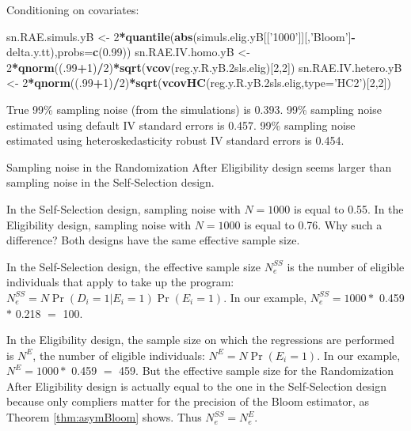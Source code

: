 \documentclass[]{book}
\newenvironment{Shaded}{\begin{snugshade}}{\end{snugshade}}
\newcommand{\KeywordTok}[1]{\textcolor[rgb]{0.13,0.29,0.53}{\textbf{#1}}}
\newcommand{\DataTypeTok}[1]{\textcolor[rgb]{0.13,0.29,0.53}{#1}}
\newcommand{\DecValTok}[1]{\textcolor[rgb]{0.00,0.00,0.81}{#1}}
\newcommand{\FloatTok}[1]{\textcolor[rgb]{0.00,0.00,0.81}{#1}}
\newcommand{\StringTok}[1]{\textcolor[rgb]{0.31,0.60,0.02}{#1}}
\newcommand{\OperatorTok}[1]{\textcolor[rgb]{0.81,0.36,0.00}{\textbf{#1}}}
\newcommand{\NormalTok}[1]{#1}
\theoremstyle{definition}
\theoremstyle{definition}
\theoremstyle{definition}
\theoremstyle{remark}
\let\BeginKnitrBlock\begin \let\EndKnitrBlock\end
\begin{document}
Conditioning on covariates:

\begin{Shaded}
\begin{Highlighting}[]
\NormalTok{sn.RAE.simuls.yB <-}\StringTok{ }\DecValTok{2}\OperatorTok{*}\KeywordTok{quantile}\NormalTok{(}\KeywordTok{abs}\NormalTok{(simuls.elig.yB[[}\StringTok{'1000'}\NormalTok{]][,}\StringTok{'Bloom'}\NormalTok{]}\OperatorTok{-}\NormalTok{delta.y.tt),}\DataTypeTok{probs=}\KeywordTok{c}\NormalTok{(}\FloatTok{0.99}\NormalTok{))}
\NormalTok{sn.RAE.IV.homo.yB <-}\StringTok{ }\DecValTok{2}\OperatorTok{*}\KeywordTok{qnorm}\NormalTok{((.}\DecValTok{99}\OperatorTok{+}\DecValTok{1}\NormalTok{)}\OperatorTok{/}\DecValTok{2}\NormalTok{)}\OperatorTok{*}\KeywordTok{sqrt}\NormalTok{(}\KeywordTok{vcov}\NormalTok{(reg.y.R.yB.2sls.elig)[}\DecValTok{2}\NormalTok{,}\DecValTok{2}\NormalTok{])}
\NormalTok{sn.RAE.IV.hetero.yB <-}\StringTok{ }\DecValTok{2}\OperatorTok{*}\KeywordTok{qnorm}\NormalTok{((.}\DecValTok{99}\OperatorTok{+}\DecValTok{1}\NormalTok{)}\OperatorTok{/}\DecValTok{2}\NormalTok{)}\OperatorTok{*}\KeywordTok{sqrt}\NormalTok{(}\KeywordTok{vcovHC}\NormalTok{(reg.y.R.yB.2sls.elig,}\DataTypeTok{type=}\StringTok{'HC2'}\NormalTok{)[}\DecValTok{2}\NormalTok{,}\DecValTok{2}\NormalTok{])}
\end{Highlighting}
\end{Shaded}

True 99\% sampling noise (from the simulations) is 0.393. 99\% sampling
noise estimated using default IV standard errors is 0.457. 99\% sampling
noise estimated using heteroskedasticity robust IV standard errors is
0.454.

\BeginKnitrBlock{remark}
\iffalse{} {Remark. } \fi{}Sampling noise in the Randomization After
Eligibility design seems larger than sampling noise in the
Self-Selection design.
\EndKnitrBlock{remark} In the Self-Selection design, sampling noise with
\(N=1000\) is equal to 0.55. In the Eligibility design, sampling noise
with \(N=1000\) is equal to 0.76. Why such a difference? Both designs
have the same effective sample size.

In the Self-Selection design, the effective sample size \(N^{SS}_e\) is
the number of eligible individuals that apply to take up the program:
\(N^{SS}_e=N\Pr(D_i=1|E_i=1)\Pr(E_i=1)\). In our example,
\(N^{SS}_e=1000 *\) 0.459 \(*\) 0.218 \(=\) 100.

In the Eligibility design, the sample size on which the regressions are
performed is \(N^{E}\), the number of eligible individuals:
\(N^{E}=N\Pr(E_i=1)\). In our example, \(N^{E}=1000 *\) 0.459 \(=\) 459.
But the effective sample size for the Randomization After Eligibility
design is actually equal to the one in the Self-Selection design because
only compliers matter for the precision of the Bloom estimator, as
Theorem \ref{thm:asymBloom} shows. Thus \(N^{SS}_e=N^{E}_e\).
\end{document}
